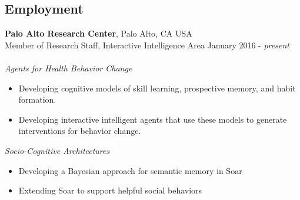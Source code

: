 \documentclass[margin,line,11pt]{res}
\begin{document}
\begin{resume}
          \section{\sc Employment}
                            {\bf Palo Alto Research Center}, Palo Alto, CA USA \\ {Member of Research Staff}, Interactive Intelligence Area \hfill January 2016 - \emph{present} \\ \\
                 \emph{Agents for Health Behavior Change}
                  \begin{itemize}
                    \item Developing cognitive models of skill
                      learning, prospective memory, and habit formation.
                    \item Developing interactive intelligent agents
                      that use these models to generate interventions
                      for behavior change.
                  \end{itemize}

                  \emph{Socio-Cognitive Architectures}
                  \begin{itemize}
                    \item Developing a Bayesian approach for semantic memory in Soar
                    \item Extending Soar to support helpful social behaviors
                      \end{itemize}
                    

\end{resume}
\end{document}
